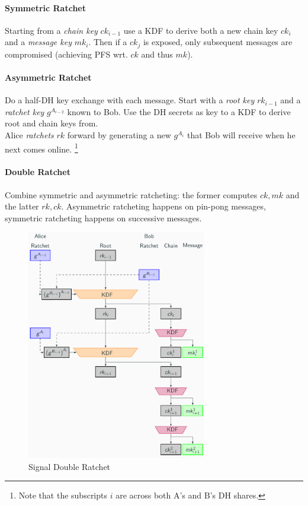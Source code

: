 \paragraph{Symmetric Ratchet}
Starting from a \emph{chain key} $ck_{i-1}$ use a KDF to derive both a new
chain key $ck_i$ and a \emph{message key} $mk_i$.
Then if a $ck_j$ is exposed, only subsequent messages are compromised
(achieving PFS wrt. $ck$ and thus $mk$).

\paragraph{Asymmetric Ratchet}
Do a half-DH key exchange with each message.
Start with a \emph{root key} $rk_{i-1}$ and a \emph{ratchet key}
$g^{A_{i-2}}$ known to Bob.
Use the DH secrets as key to a KDF to derive root and chain keys from.
\\
Alice \emph{ratchets} $rk$ forward by generating a new $g^{A_i}$ that Bob will receive when he next comes online.%
\footnote{Note that the subscripts $i$ are across both A's and B's DH shares.}

\paragraph{Double Ratchet}
Combine symmetric and asymmetric ratcheting: the former computes $ck, mk$
and the latter $rk, ck$.
Asymmetric ratcheting happens on pin-pong messages, symmetric ratcheting happens
on successive messages.

\begin{figure}[h]
    \centering
	\includegraphics[width=0.7\textwidth]{images/signal-double-ratchet.png}
    \caption{Signal Double Ratchet}
    \label{fig:signal-double-ratchet}
\end{figure}

